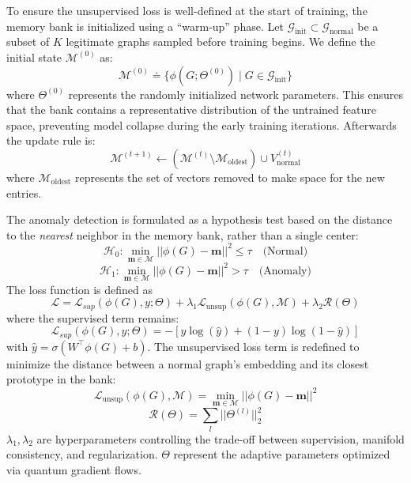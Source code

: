 To ensure the unsupervised loss is well-defined at the start of training, the memory bank is initialized using a ``warm-up'' phase. Let $\mathcal{G}_{\text{init}} \subset \mathcal{G}_{\text{normal}}$ be a subset of $K$ legitimate graphs sampled before training begins. We define the initial state $\mathcal{M}^{(0)}$ as:
\begin{equation}
    \mathcal{M}^{(0)} \doteq \{ \phi(G; \Theta^{(0)}) \mid G \in \mathcal{G}_{\text{init}} \}
\end{equation}
where $\Theta^{(0)}$ represents the randomly initialized network parameters. This ensures that the bank contains a representative distribution of the untrained feature space, preventing model collapse during the early training iterations.
Afterwards the update rule is:
\begin{equation}
    \mathcal{M}^{(t+1)} \leftarrow \left( \mathcal{M}^{(t)} \setminus \mathcal{M}_{\text{oldest}} \right) \cup V_{\text{normal}}^{(t)}
\end{equation}
where $\mathcal{M}_{\text{oldest}}$ represents the set of vectors removed to make space for the new entries.

The anomaly detection is formulated as a hypothesis test based on the distance to the \textit{nearest} neighbor in the memory bank, rather than a single center:
\begin{equation}
    \mathcal{H}_{0}: \min_{\mathbf{m} \in \mathcal{M}} ||\phi(G) - \mathbf{m}||^2 \le \tau \quad \text{(Normal)}
\end{equation}
\begin{equation}
    \mathcal{H}_{1}: \min_{\mathbf{m} \in \mathcal{M}} ||\phi(G) - \mathbf{m}||^2 > \tau \quad \text{(Anomaly)}
\end{equation}
The loss function is defined as
\begin{equation}
    \mathcal{L} = \mathcal{L}_{sup}(\phi(G), y; \Theta) + \lambda_{1} \mathcal{L}_{\text{unsup}}(\phi(G), \mathcal{M}) + \lambda_{2}\mathcal{R}(\Theta)
\end{equation}
where the supervised term remains:
\begin{equation}
    \mathcal{L}_{sup}(\phi(G), y; \Theta) = - \left[ y \log(\hat{y}) + (1 - y) \log(1 - \hat{y}) \right]
\end{equation}
with $\hat{y} = \sigma(W^\top \phi(G) + b)$. The unsupervised loss term is redefined to minimize the distance between a normal graph's embedding and its closest prototype in the bank:
\begin{equation}
    \mathcal{L}_{\text{unsup}}(\phi(G), \mathcal{M}) = \min_{\mathbf{m} \in \mathcal{M}} ||\phi(G) - \mathbf{m}||^2
\end{equation}
\begin{equation}
    \mathcal{R}(\Theta)=\sum_{l}||\Theta^{(l)}||_{2}^{2}
\end{equation}
$\lambda_1, \lambda_2$ are hyperparameters controlling the trade-off between supervision, manifold consistency, and regularization. $\Theta$ represent the adaptive parameters optimized via quantum gradient flows.

